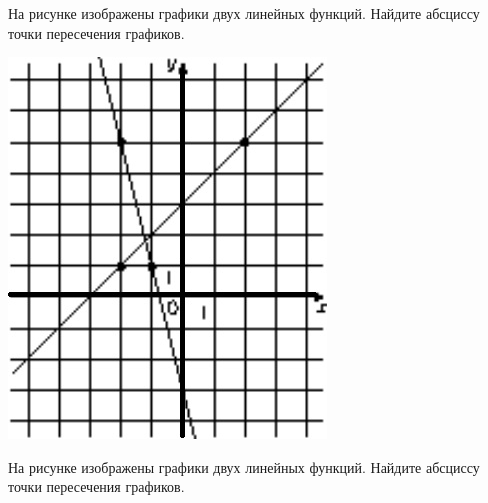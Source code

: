 \begin{homework}[number=2]
	\begin{listofex}
		\item 
		\begin{minipage}[t]{0.43\textwidth}
			На рисунке изображены графики двух линейных функций. Найдите абсциссу точки пересечения графиков.
		\end{minipage}
		\begin{minipage}[c]{0.1\textwidth}
			\includegraphics[align=t, width=\textwidth]{pics/G102M4H2-1.jpg}
		\end{minipage}
		\item 
		\begin{minipage}[t]{0.43\textwidth}
			На рисунке изображены графики двух линейных функций. Найдите абсциссу точки пересечения графиков.
		\end{minipage}
		\begin{minipage}[c]{0.1\textwidth}

\end{minipage}
\end{listofex}
\end{homework}

